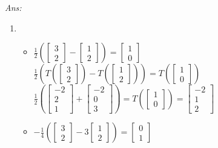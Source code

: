 \documentclass[12pt]{amsart}
\newcommand\sol[1]{
\medskip
\begin{mdframed}
\emph{Ans:\\} #1
\end{mdframed}
\medskip
}
\begin{document}
\begin{enumerate}
\sol{
  \begin{enumerate}
    \item
    \begin{itemize}
      \item $\frac{1}{2}(\left[\begin{matrix} 3 \\ 2 \end{matrix}\right]-\left[\begin{matrix} 1 \\ 2 \end{matrix}\right])=\left[\begin{matrix} 1 \\ 0 \end{matrix}\right]$\\
            $\frac{1}{2}(T(\left[\begin{matrix} 3 \\ 2 \end{matrix}\right])-T(\left[\begin{matrix} 1 \\ 2 \end{matrix}\right]))=T(\left[\begin{matrix} 1 \\ 0 \end{matrix}\right])$\\
            $\frac{1}{2}(\left[\begin{matrix} -2 \\ 2 \\ 1 \end{matrix}\right]+\left[\begin{matrix} -2 \\ 0 \\ 3 \end{matrix}\right])=T(\left[\begin{matrix} 1 \\ 0 \end{matrix}\right])=\left[\begin{matrix} -2 \\ 1 \\ 2 \end{matrix}\right]$\\
      \item $-\frac{1}{4}(\left[\begin{matrix} 3 \\ 2 \end{matrix}\right]-3\left[\begin{matrix} 1 \\ 2 \end{matrix}\right])=\left[\begin{matrix} 0 \\ 1 \end{matrix}\right]$\\

\end{itemize}
\end{enumerate}}
\end{enumerate}
\end{document}
